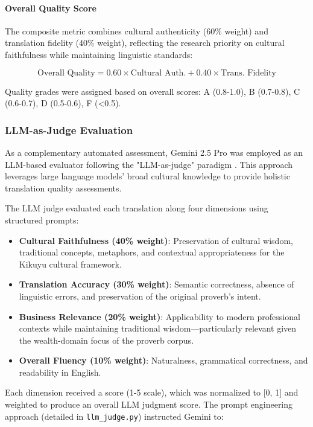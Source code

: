 \paragraph{Overall Quality Score}
The composite metric combines cultural authenticity (60\% weight) and translation fidelity (40\% weight), reflecting the research priority on cultural faithfulness while maintaining linguistic standards:

\[
\text{Overall Quality} = 0.60 \times \text{Cultural Auth.} + 0.40 \times \text{Trans. Fidelity}
\]

Quality grades were assigned based on overall scores: A (0.8-1.0), B (0.7-0.8), C (0.6-0.7), D (0.5-0.6), F (<0.5).

\subsubsection{LLM-as-Judge Evaluation}
\label{subsubsec:llm_judge}

As a complementary automated assessment, Gemini 2.5 Pro was employed as an LLM-based evaluator following the "LLM-as-judge" paradigm \cite{wang2023pandalm}. This approach leverages large language models' broad cultural knowledge to provide holistic translation quality assessments.

The LLM judge evaluated each translation along four dimensions using structured prompts:

\begin{itemize}
    \item \textbf{Cultural Faithfulness (40\% weight)}: Preservation of cultural wisdom, traditional concepts, metaphors, and contextual appropriateness for the Kikuyu cultural framework.
    
    \item \textbf{Translation Accuracy (30\% weight)}: Semantic correctness, absence of linguistic errors, and preservation of the original proverb's intent.
    
    \item \textbf{Business Relevance (20\% weight)}: Applicability to modern professional contexts while maintaining traditional wisdom—particularly relevant given the wealth-domain focus of the proverb corpus.
    
    \item \textbf{Overall Fluency (10\% weight)}: Naturalness, grammatical correctness, and readability in English.
\end{itemize}

Each dimension received a score (1-5 scale), which was normalized to [0, 1] and weighted to produce an overall LLM judgment score. The prompt engineering approach (detailed in \texttt{llm\_judge.py}) instructed Gemini to:

